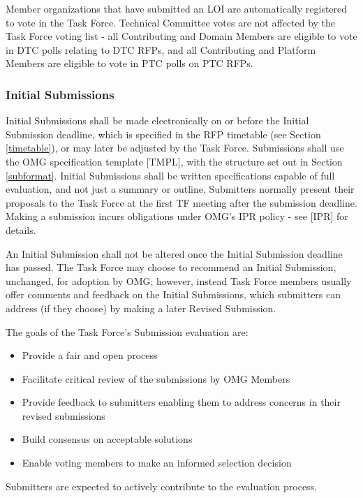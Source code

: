 Member organizations that have submitted an LOI are automatically registered to vote in the Task Force. Technical Committee votes are not affected by the Task Force voting list - all Contributing and Domain Members are eligible to vote in DTC polls relating to DTC RFPs, and all Contributing and Platform Members are eligible to vote in PTC polls on PTC RFPs.



\subsubsection{Initial Submissions}

Initial Submissions shall be made electronically on or before the Initial Submission deadline, which is specified in the RFP timetable (see Section \ref{timetable}), or may later be adjusted by the Task Force. Submissions shall use the OMG specification template [TMPL], with the structure set out in Section \ref{subformat}. Initial Submissions shall be written specifications capable of full evaluation, and not just a summary or outline. Submitters normally present their proposals to the Task Force at the first TF meeting after the submission deadline. Making a submission incurs obligations under OMG's IPR policy - see [IPR] for details.

An Initial Submission shall not be altered once the Initial Submission deadline has passed. The Task Force may choose to recommend an Initial Submission, unchanged, for adoption by OMG; however, instead Task Force members usually offer comments and feedback on the Initial Submissions, which submitters can address (if they choose) by making a later Revised Submission.

The goals of the Task Force's Submission evaluation are:

\begin{itemize}
\item    Provide a fair and open process
\item    Facilitate critical review of the submissions by OMG Members
\item    Provide feedback to submitters enabling them to address concerns in their revised submissions
\item    Build consensus on acceptable solutions
\item    Enable voting members to make an informed selection decision

\end{itemize}
Submitters are expected to actively contribute to the evaluation process.


